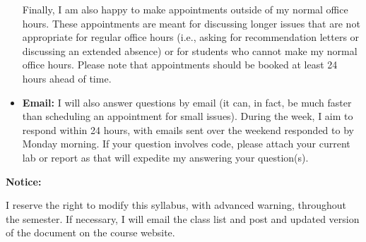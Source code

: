 \documentclass[12pt]{article}
\begin{document}
\begin{itemize}
Finally, I am also happy to make appointments outside of my normal
office hours. These appointments are meant for discussing
longer issues that are not appropriate for regular office hours (i.e., asking
for recommendation letters or discussing an extended absence) or for students
who cannot make my normal office hours. Please note that appointments should
be booked at least 24 hours ahead of time.
\item \textbf{Email:} I will also answer questions by email (it can, in fact,
be much faster than scheduling an appointment for small issues). During the
week, I aim to respond within 24 hours, with emails sent over the weekend
responded to by Monday morning. If your question involves code, please attach
your current lab or report as that will expedite my answering your question(s).
\end{itemize}

\bigskip

\textbf{Notice:} \vspace{6pt}

I reserve the right to modify this syllabus, with advanced warning, throughout
the semester. If necessary, I will email the class list and post and updated
version of the document on the course website.






\end{document}
